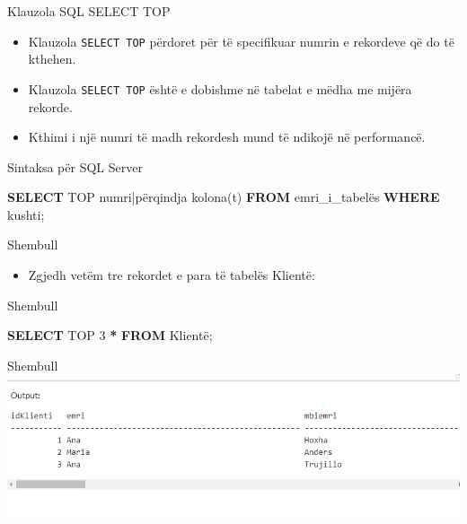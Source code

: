 \documentclass[
  ignorenonframetext,
]{beamer}
\newenvironment{Shaded}{\begin{snugshade}}{\end{snugshade}}
\newcommand{\DecValTok}[1]{\textcolor[rgb]{0.00,0.00,0.81}{#1}}
\newcommand{\KeywordTok}[1]{\textcolor[rgb]{0.13,0.29,0.53}{\textbf{#1}}}
\newcommand{\NormalTok}[1]{#1}
\newcommand{\OperatorTok}[1]{\textcolor[rgb]{0.81,0.36,0.00}{\textbf{#1}}}
\providecommand{\tightlist}{%
  \setlength{\itemsep}{0pt}\setlength{\parskip}{0pt}}
\begin{document}
\begin{frame}[fragile]{Klauzola SQL SELECT TOP}
\label{klauzola-sql-select-top}
\begin{itemize}
\item
  Klauzola \texttt{SELECT\ TOP} përdoret për të specifikuar numrin e
  rekordeve që do të kthehen.
\item
  Klauzola \texttt{SELECT\ TOP} është e dobishme në tabelat e mëdha me
  mijëra rekorde.
\item
  Kthimi i një numri të madh rekordesh mund të ndikojë në performancë.
\end{itemize}
\end{frame}

\begin{frame}[fragile]{Sintaksa për SQL Server}
\label{sintaksa-puxebr-sql-server}

\begin{Shaded}
\begin{Highlighting}[]
\KeywordTok{SELECT}\NormalTok{ TOP numri|përqindja kolona(t)}
\KeywordTok{FROM}\NormalTok{ emri\_i\_tabelës}
\KeywordTok{WHERE}\NormalTok{ kushti;}
\end{Highlighting}
\end{Shaded}
\end{frame}

\begin{frame}{Shembull}
\label{shembull-13}
\begin{itemize}
\tightlist
\item
  Zgjedh vetëm tre rekordet e para të tabelës Klientë:
\end{itemize}
\end{frame}

\begin{frame}[fragile]{Shembull}
\label{shembull-14}

\begin{Shaded}
\begin{Highlighting}[]
\KeywordTok{SELECT}\NormalTok{ TOP }\DecValTok{3} \OperatorTok{*} \KeywordTok{FROM}\NormalTok{ Klientë;}
\end{Highlighting}
\end{Shaded}
\end{frame}

\begin{frame}{Shembull}
\label{shembull-15}
\includegraphics{./Figs/query40.png}
\end{frame}
\end{document}
